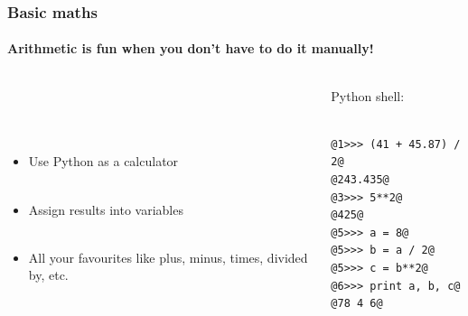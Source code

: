\documentclass{beamer}
\begin{document}
\begin{frame}[fragile]
\frametitle{Basic maths}
\framesubtitle{Arithmetic is fun when you don't have to do it manually!}
\large
  \begin{columns}[T]
    \begin{column}{.5\textwidth} 
\ \\ 

\ \\ 

\ \\ 


\begin{itemize}



 \item Use Python as a calculator\\ \
 \item  Assign results into variables \\ \

 \item All your favourites like plus, minus, times, divided by, etc. \\ \


\end{itemize}
     \end{column}
     
         \begin{column}{.5\textwidth} 
         Python shell: \\ \
\begin{lstlisting}[style=base]
@1>>> (41 + 45.87) / 2@
@243.435@
@3>>> 5**2@
@425@
@5>>> a = 8@
@5>>> b = a / 2@
@5>>> c = b**2@
@6>>> print a, b, c@
@78 4 6@
\end{lstlisting}

    \end{column}
    \end{columns}

\end{frame}
\end{document}
